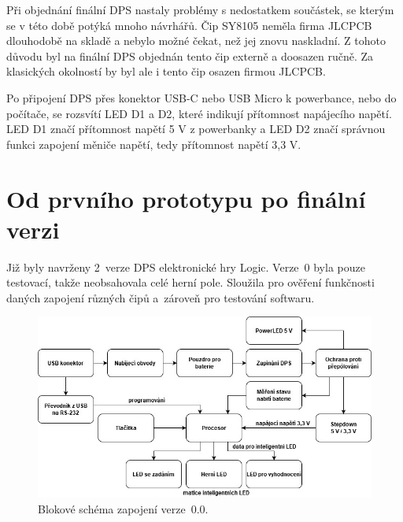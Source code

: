   Při objednání finální DPS nastaly problémy s nedostatkem součástek, se kterým se v této době potýká mnoho návrhářů. Čip SY8105 neměla %
  firma JLCPCB dlouhodobě na skladě a nebylo možné čekat, než jej znovu naskladní. Z tohoto důvodu byl na finální DPS objednán tento čip 
  externě a doosazen ručně. Za klasických okolností by byl ale i tento čip osazen firmou JLCPCB.

  Po připojení DPS přes konektor USB-C nebo USB Micro k powerbance, nebo do počítače, se rozsvítí LED D1 a D2, které indikují přítomnost 
  napájecího napětí. LED D1 značí přítomnost napětí 5 V z powerbanky a LED D2 značí správnou funkci zapojení měniče napětí, tedy přítomnost 
  napětí 3,3 V.

  \chapter{Od prvního prototypu po finální verzi} %

  Již byly navrženy 2~verze DPS elektronické hry Logic. Verze~0 byla pouze testovací, takže neobsahovala celé herní pole. 
  Sloužila pro ověření funkčnosti daných zapojení různých čipů a~zároveň pro testování softwaru.

  \begin{figure}[!h]
    \begin{center}
      \includegraphics[scale=0.5]{obrazky/v0_blokove_schema.jpg}
    \end{center}
    \caption[Blokové schéma zapojení verze~0.0]{Blokové schéma zapojení verze~0.0.}
  \end{figure}

